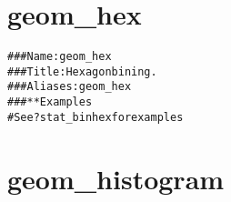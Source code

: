\documentclass[a4paper,titlepage]{tufte-handout}\usepackage{graphicx, color}
\makeatletter
\newcommand{\hlcomment}[1]{\textcolor[rgb]{0.180392156862745,0.6,0.341176470588235}{#1}}%
\newenvironment{kframe}{%
 \def\at@end@of@kframe{}%
 \ifinner\ifhmode%
  \def\at@end@of@kframe{\end{minipage}}%
  \begin{minipage}{\columnwidth}%
 \fi\fi%
 \def\FrameCommand##1{\hskip\@totalleftmargin \hskip-\fboxsep
 \colorbox{shadecolor}{##1}\hskip-\fboxsep
     \hskip-\linewidth \hskip-\@totalleftmargin \hskip\columnwidth}%
 \MakeFramed {\advance\hsize-\width
   \@totalleftmargin\z@ \linewidth\hsize
   \@setminipage}}%
 {\par\unskip\endMakeFramed%
 \at@end@of@kframe}
\newenvironment{knitrout}{}{} %
\makeatother
\begin{document}
\section{geom\_hex}

\begin{knitrout}
\color{fgcolor}\begin{kframe}
\begin{alltt}
\hlcomment{### Name: geom_hex}
\hlcomment{### Title: Hexagon bining.}
\hlcomment{### Aliases: geom_hex}
\hlcomment{### ** Examples}
\hlcomment{# See ?stat_binhex for examples}
\end{alltt}
\end{kframe}
\end{knitrout}


\section{geom\_histogram}
\end{document}
